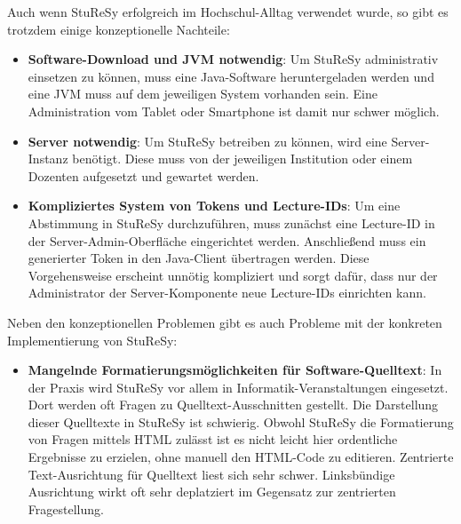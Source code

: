 Auch wenn StuReSy erfolgreich im Hochschul-Alltag verwendet wurde, so gibt es trotzdem einige konzeptionelle Nachteile:
\begin{itemize}
    \item \textbf{Software-Download und JVM notwendig}: Um StuReSy administrativ einsetzen zu können, muss eine Java-Software heruntergeladen werden und eine JVM muss auf dem jeweiligen System vorhanden sein. Eine Administration vom Tablet oder Smartphone ist damit nur schwer möglich.
    \item \textbf{Server notwendig}: Um StuReSy betreiben zu können, wird eine Server-Instanz benötigt. Diese muss von der jeweiligen Institution oder einem Dozenten aufgesetzt und gewartet werden.
    \item \textbf{Kompliziertes System von Tokens und Lecture-IDs}: Um eine Abstimmung in StuReSy durchzuführen, muss zunächst eine Lecture-ID in der Server-Admin-Oberfläche eingerichtet werden. Anschließend muss ein generierter Token in den Java-Client übertragen werden. Diese Vorgehensweise erscheint unnötig kompliziert und sorgt dafür, dass nur der Administrator der Server-Komponente neue Lecture-IDs einrichten kann.
\end{itemize}

Neben den konzeptionellen Problemen gibt es auch Probleme mit der konkreten Implementierung von StuReSy:
\begin{itemize}
\item \textbf{Mangelnde Formatierungsmöglichkeiten für Software-Quelltext}: In der Praxis wird StuReSy vor allem in Informatik-Veranstaltungen eingesetzt. Dort werden oft Fragen zu Quelltext-Ausschnitten gestellt. Die Darstellung dieser Quelltexte in StuReSy ist schwierig. Obwohl StuReSy die Formatierung von Fragen mittels HTML zulässt ist es nicht leicht hier ordentliche Ergebnisse zu erzielen, ohne manuell den HTML-Code zu editieren. Zentrierte Text-Ausrichtung für Quelltext liest sich sehr schwer. Linksbündige Ausrichtung wirkt oft sehr deplatziert im Gegensatz zur zentrierten Fragestellung.
\end{itemize}

